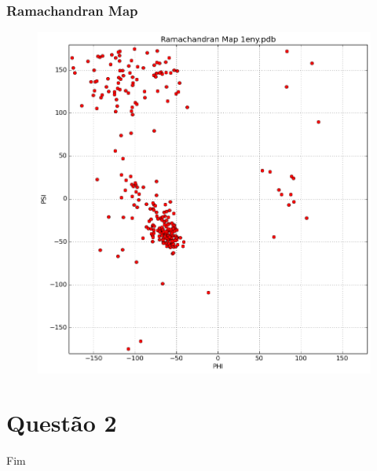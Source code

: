 \documentclass{beamer}
\begin{document}
\begin{frame}
\frametitle{Ramachandran Map}
\begin{figure}
\includegraphics[width=0.6\linewidth]{1eny.png}
\end{figure}
\end{frame}

\section{Questão 2} 



\begin{frame}
\Huge{\centerline{Fim}}
\end{frame}

\end{document}

